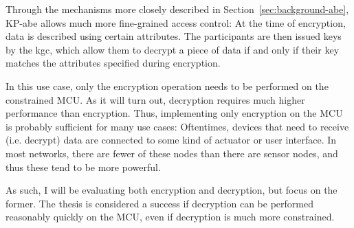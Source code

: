 Through the mechanisms more closely described in Section~\ref{sec:background-abe}, KP-\acrshort{abe} allows much more fine-grained access control:
At the time of encryption, data is described using certain \glspl{attribute}.
The participants are then issued keys by the \acrfull{kgc}, which allow them to decrypt a piece of data if and only if their key matches the attributes specified during encryption.

In this use case, only the encryption operation needs to be performed on the constrained MCU.
As it will turn out, decryption requires much higher performance than encryption.
Thus, implementing only encryption on the MCU is probably sufficient for many use cases:
Oftentimes, devices that need to receive (i.e. decrypt) data are connected to some kind of actuator or user interface. 
In most networks, there are fewer of these nodes than there are sensor nodes, and thus these tend to be more powerful. %

As such, I will be evaluating both encryption and decryption, but focus on the former.
The thesis is considered a success if decryption can be performed reasonably quickly on the MCU, even if decryption is much more constrained.






